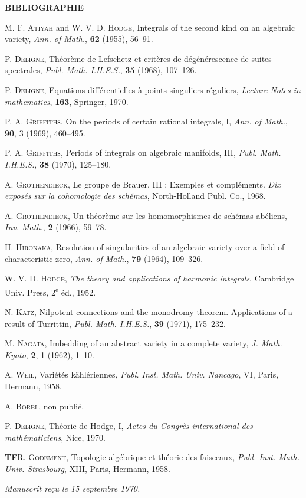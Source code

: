 \documentclass[10pt]{article}
\begin{document}
\begin{center}
\bfseries BIBLIOGRAPHIE
\end{center}

\begin{enumerate}[label={[\arabic*]},leftmargin=2.8em]
\item \textsc{M. F. Atiyah} and \textsc{W. V. D. Hodge}, Integrals of the second kind on an algebraic variety, \emph{Ann. of Math.}, \textbf{62} (1955), 56--91.
\item \textsc{P. Deligne}, Théorème de Lefschetz et critères de dégénérescence de suites spectrales, \emph{Publ. Math. I.H.E.S.}, \textbf{35} (1968), 107--126.
\item \textsc{P. Deligne}, Equations différentielles à points singuliers réguliers, \emph{Lecture Notes in mathematics}, \textbf{163}, Springer, 1970.
\item \textsc{P. A. Griffiths}, On the periods of certain rational integrals, I, \emph{Ann. of Math.}, \textbf{90}, 3 (1969), 460--495.
\item \textsc{P. A. Griffiths}, Periods of integrals on algebraic manifolds, III, \emph{Publ. Math. I.H.E.S.}, \textbf{38} (1970), 125--180.
\item \textsc{A. Grothendieck}, Le groupe de Brauer, III : Exemples et compléments. \emph{Dix exposés sur la cohomologie des schémas}, North-Holland Publ. Co., 1968.
\item \textsc{A. Grothendieck}, Un théorème sur les homomorphismes de schémas abéliens, \emph{Inv. Math.}, \textbf{2} (1966), 59--78.
\item \textsc{H. Hironaka}, Resolution of singularities of an algebraic variety over a field of characteristic zero, \emph{Ann. of Math.}, \textbf{79} (1964), 109--326.
\item \textsc{W. V. D. Hodge}, \emph{The theory and applications of harmonic integrals}, Cambridge Univ. Press, 2\textsuperscript{e} éd., 1952.
\item \textsc{N. Katz}, Nilpotent connections and the monodromy theorem. Applications of a result of Turrittin, \emph{Publ. Math. I.H.E.S.}, \textbf{39} (1971), 175--232.
\item \textsc{M. Nagata}, Imbedding of an abstract variety in a complete variety, \emph{J. Math. Kyoto}, \textbf{2}, 1 (1962), 1--10.
\item \textsc{A. Weil}, Variétés kählériennes, \emph{Publ. Inst. Math. Univ. Nancago}, VI, Paris, Hermann, 1958.
\item \textsc{A. Borel}, non publié.
\item \textsc{P. Deligne}, Théorie de Hodge, I, \emph{Actes du Congrès international des mathématiciens}, Nice, 1970.
\end{enumerate}

\noindent\textbf{TF}\quad \textsc{R. Godement}, Topologie algébrique et théorie des faisceaux, \emph{Publ. Inst. Math. Univ. Strasbourg}, XIII, Paris, Hermann, 1958.

\begin{center}
\emph{Manuscrit reçu le 15 septembre 1970.}
\end{center}

\end{document}
